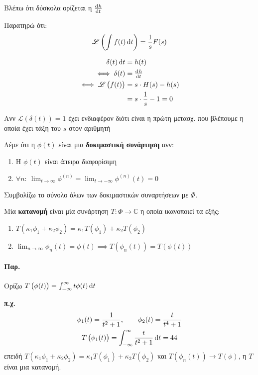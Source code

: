 \documentclass[11pt,a4paper,titlepage,final]{article}
\begin{document}
Βλέπω ότι δύσκολα ορίζεται η \( \od{h}{t} \)

Παρατηρώ ότι:
\[
\mathscr L \left(\int f(t)\dif t \right) = \frac{1}{s} F(s)
\]

\begin{align*}
\delta(t) \dif t &= h(t) \\
\iff \delta(t) &= \od{h}{t} \\
\iff \mathscr L \left(f(t) \right) &= s \cdot H(s) - h(s) \\
&= s \cdot \frac{1}{s} - 1 = 0
\end{align*}

Ανν \( \mathscr L \left( \delta(t) \right) =1 \) έχει ενδιαφέρον διότι είναι η πρώτη μετασχ. που βλέπουμε η οποία έχει τάξη του \( s \) στον αριθμητή

\begin{defn}{}{}
Λέμε ότι η \( \phi(t) \) είναι μια \textbf{δοκιμαστική συνάρτηση} ανν:

\begin{enumerate}
\item Η \( \phi(t) \) είναι άπειρα διαφορίσιμη
\item \( \forall n:\ \lim_{t \to \infty}\phi^{(n)} = \lim_{t\to - \infty}\phi^{(n)}(t) = 0 \)
\end{enumerate}

\end{defn}

Συμβολίζω το σύνολο όλων των δοκιμαστικών συναρτήσεων με \( \Phi \).

\begin{defn}{}{}
Μία \textbf{κατανομή} είναι μία συνάρτηση \( T: \Phi \to \mathbb C \) η οποία ικανοποιεί τα εξής:
\begin{enumerate}
\item \( T(\kappa_1\phi_1 + \kappa_2\phi_2) = \kappa_1T(\phi_1) + \kappa_2T(\phi_2) \)
\item \( \lim_{n\to \infty} \phi_n(t) = \phi(t) \implies T\left(\phi_n(t) \right) = T \left( \phi(t) \right) \)
\end{enumerate}
\end{defn}

\paragraph{Παρ.}
Ορίζω \(T\left(\phi(t)\right) = \int_{-\infty}^\infty t\phi(t) \dif t \)

\textbf{π.χ.}
\begin{gather*}
\phi_1(t) = \frac{1}{t^2+1},\qquad \phi_2(t) = \frac{t}{t^4+1} \\
T\left( \phi_1(t) \right) = \int_{-\infty}^\infty \frac{t}{t^2+1} \dif t = 44
\end{gather*}
επειδή \( T(\kappa_1 \phi_1 + \kappa_2\phi_2) = \kappa_1T(\phi_1)+\kappa_2T(\phi_2)  \) και \( T\left(\phi_n(t) \right) \to T(\phi) \), η \( T \) είναι μια κατανομή.
\end{document}

